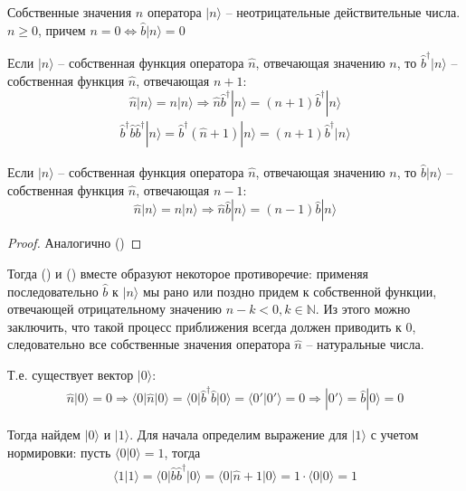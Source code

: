 \documentclass[__main__.tex]{subfiles}
\begin{document}
\begin{theorem}
	Собственные значения $n$ оператора $|n\rangle$ -- неотрицательные действительные числа.
	\\
	$n\ge 0$, причем $n=0\Leftrightarrow \hat{b}|n\rangle = 0$\\
\end{theorem}

\begin{theorem}
	Если $|n\rangle$ -- собственная функция оператора $\hat{n}$, отвечающая значению $n$, то $\hat{b}^\dagger|n\rangle$ -- собственная функция $\hat{n}$, отвечающая $n+1$:
	$$
	\hat{n}|n\rangle=n|n\rangle\Longrightarrow\hat{n}\hat{b}^\dagger|n\rangle=(n+1)\hat{b}^\dagger|n\rangle
	$$
	\begin{gather*}
	\hat{b}^\dagger\hat{b}\hat{b}^\dagger|n\rangle
	=
	\hat{b}^\dagger(\hat{n}+1)|n\rangle
	=
	(n+1)\hat{b}^\dagger|n\rangle
	\end{gather*}
\end{theorem}

\begin{theorem}
	Если $|n\rangle$ -- собственная функция оператора $\hat{n}$, отвечающая значению $n$, то $\hat{b}|n\rangle$ -- собственная функция $\hat{n}$, отвечающая $n-1$:
	$$
	\hat{n}|n\rangle=n|n\rangle\Longrightarrow\hat{n}\hat{b}|n\rangle=(n-1)\hat{b}|n\rangle
	$$
\end{theorem}
\begin{proof}
	Аналогично ()
\end{proof}
Тогда () и () вместе образуют некоторое противоречие: применяя последовательно $\hat{b}$ к $|n\rangle$ мы рано или поздно придем к собственной функции, отвечающей отрицательному значению $n-k<0,k\in\mathbb{N}$. Из этого можно заключить, что такой процесс приближения всегда должен приводить к $0$, следовательно все собственные значения оператора $\hat{n}$ -- натуральные числа.

Т.е. существует вектор $|0\rangle$:
\begin{gather*}
\hat{n}|0\rangle = 0
\Longrightarrow
\langle 0|\hat{n}|0\rangle = \langle 0|\hat{b}^\dagger\hat{b}|0\rangle = \langle 0'|0'\rangle = 0
\Longrightarrow
|0'\rangle = \hat{b}|0\rangle = 0
\end{gather*}

Тогда найдем $|0\rangle$ и $|1\rangle$. Для начала определим выражение для $|1\rangle$ с учетом нормировки: пусть $\langle 0|0\rangle=1$, тогда
\begin{gather*}
\langle 1|1\rangle = \langle 0|\hat{b}\hat{b}^\dagger|0\rangle = \langle 0|\hat{n}+1|0\rangle =1\cdot\langle 0| 0\rangle = 1
\end{gather*}
\end{document}
